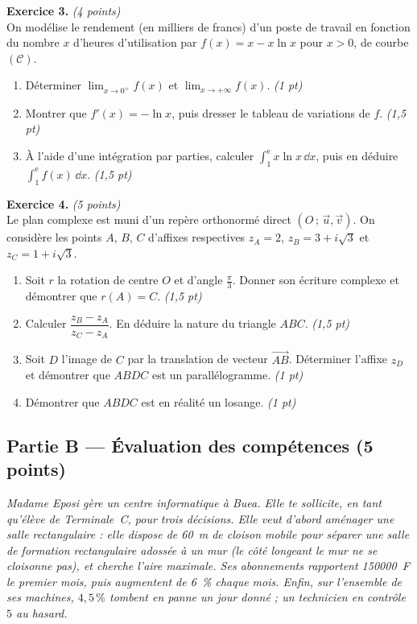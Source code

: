 \smallskip
\noindent\textbf{Exercice 3.} \hfill\textit{(4 points)}\\
On modélise le rendement (en milliers de francs) d'un poste de travail en fonction du
nombre $x$ d'heures d'utilisation par $f(x)=x-x\ln x$ pour $x>0$, de courbe $(\mathcal{C})$.
\begin{enumerate}[label=\arabic*)]
\item Déterminer $\displaystyle\lim_{x\to0^+}f(x)$ et $\displaystyle\lim_{x\to+\infty}f(x)$. \hfill\textit{(1 pt)}
\item Montrer que $f'(x)=-\ln x$, puis dresser le tableau de variations de $f$. \hfill\textit{(1,5 pt)}
\item À l'aide d'une intégration par parties, calculer $\displaystyle\int_1^{\mathrm{e}}x\ln x\,\dd x$,
puis en déduire $\displaystyle\int_1^{\mathrm{e}}f(x)\,\dd x$. \hfill\textit{(1,5 pt)}
\end{enumerate}

\smallskip
\noindent\textbf{Exercice 4.} \hfill\textit{(5 points)}\\
Le plan complexe est muni d'un repère orthonormé direct $(O\,;\,\vec u,\vec v)$. On considère
les points $A$, $B$, $C$ d'affixes respectives $z_A=2$, $z_B=3+i\sqrt3$ et $z_C=1+i\sqrt3$.
\begin{enumerate}[label=\arabic*)]
\item Soit $r$ la rotation de centre $O$ et d'angle $\frac\pi3$. Donner son écriture
complexe et démontrer que $r(A)=C$. \hfill\textit{(1,5 pt)}
\item Calculer $\dfrac{z_B-z_A}{z_C-z_A}$. En déduire la nature du triangle $ABC$. \hfill\textit{(1,5 pt)}
\item Soit $D$ l'image de $C$ par la translation de vecteur $\vec{AB}$. Déterminer
l'affixe $z_D$ et démontrer que $ABDC$ est un parallélogramme. \hfill\textit{(1 pt)}
\item Démontrer que $ABDC$ est en réalité un losange. \hfill\textit{(1 pt)}
\end{enumerate}

\subsection*{Partie B — Évaluation des compétences \hfill (5 points)}

\noindent\textit{Madame Eposi gère un centre informatique à Buea. Elle te sollicite, en tant
qu'élève de Terminale~C, pour trois décisions. Elle veut d'abord aménager une salle
rectangulaire : elle dispose de \SI{60}{\metre} de cloison mobile pour séparer une salle de
formation rectangulaire \emph{adossée à un mur} (le côté longeant le mur ne se cloisonne pas),
et cherche l'aire maximale. Ses abonnements rapportent \SI{150000}{F} le premier mois, puis
augmentent de \SI{6}{\percent} chaque mois. Enfin, sur l'ensemble de ses machines, $4{,}5\,\%$
tombent en panne un jour donné ; un technicien en contrôle $5$ au hasard.}

